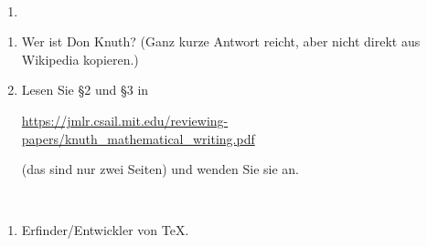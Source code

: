 \bigskip

\begin{lsg}\mbox{ }
\begin{enumerate}[label=$\mathrm{(\roman*)}$, ref=$\mathrm{\roman*}$]
\item 
\end{enumerate}
\end{lsg}


\bigskip

\begin{aufg} \mbox{}
\begin{enumerate}[label=$\mathrm{(\roman*)}$, ref=$\mathrm{\roman*}$]
\item Wer ist Don Knuth? (Ganz kurze Antwort reicht, aber nicht direkt aus Wikipedia kopieren.)
\item Lesen Sie §2 und §3 in
\begin{center}
 \url{https://jmlr.csail.mit.edu/reviewing-papers/knuth_mathematical_writing.pdf}
\end{center}
(das sind nur zwei Seiten) und wenden Sie sie an.
\end{enumerate}
\end{aufg}

\bigskip

\begin{lsg}\mbox{ }
\begin{enumerate}[label=$\mathrm{(\roman*)}$, ref=$\mathrm{\roman*}$]
\item Erfinder/Entwickler von TeX.
\end{enumerate}
\end{lsg}

